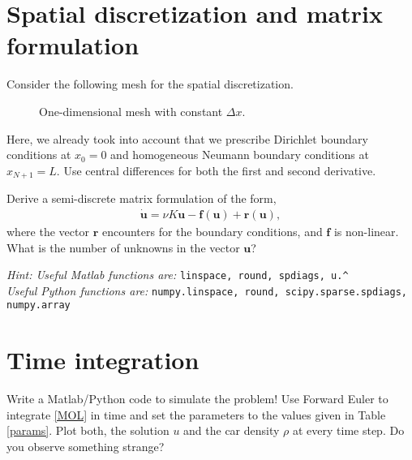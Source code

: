 \documentclass[a4paper,10pt]{article}
\begin{document}
\section{Spatial discretization and matrix formulation}
Consider the following mesh for the spatial discretization.
\begin{figure}[ht]
\centering
{}
\caption{One-dimensional mesh with constant $\Delta x$.}
\end{figure}
Here, we already took into account that we prescribe Dirichlet boundary conditions at $x_0 = 0$ and homogeneous Neumann boundary conditions at $x_{N+1} = L$. Use central differences for both the first and second derivative.

Derive a semi-discrete matrix formulation of the form,
\begin{align}
\label{MOL}
\dot{\mathbf{u}} = \nu K \mathbf{u} - \mathbf{f}(\mathbf{u}) + \mathbf{r}(\mathbf{u}),
\end{align}
where the vector $\mathbf{r}$ encounters for the boundary conditions, and $\mathbf{f}$ is non-linear. What is the number of unknowns in the vector $\mathbf{u}$?

\textit{Hint: Useful Matlab functions are: } \texttt{linspace, round, spdiags, u.\^ }\\
\textit{\phantom{\indent Hint:} Useful Python functions are: } \texttt{numpy.linspace, round, scipy.sparse.spdiags,}\\
 \texttt{numpy.array}
\section{Time integration}
Write a Matlab/Python code to simulate the problem! Use Forward Euler to integrate \eqref{MOL} in time and set the parameters to the values given in Table \ref{params}. Plot both, the solution $u$ and the car density $\rho$ at every time step. Do you observe something strange?
\end{document}
